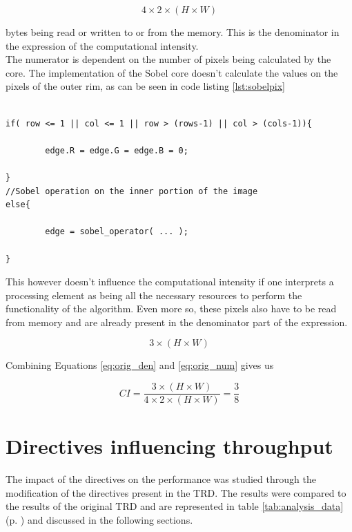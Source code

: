 \begin{equation} \label{eq:orig_den}
4 \times 2 \times ( H \times W )
\end{equation}

bytes being read or written to or from the memory. This is the denominator in the expression of the computational intensity.\\
The numerator is dependent on the number of pixels being calculated by the core. The implementation of the Sobel core doesn't calculate the values on the pixels of the outer rim, as can be seen in code listing \ref{lst:sobelpix}

\begin{lstlisting}[caption=Sobel Code Snippet, captionpos=b, label=lst:sobelpix]

if( row <= 1 || col <= 1 || row > (rows-1) || col > (cols-1)){
		
		edge.R = edge.G = edge.B = 0;
		
}
//Sobel operation on the inner portion of the image
else{

		edge = sobel_operator( ... );
		
}

\end{lstlisting}

This however doesn't influence the computational intensity if one interprets a processing element as being all the necessary resources to perform the functionality of the algorithm. Even more so, these pixels also have to be read from memory and are already present in the denominator part of the expression.


\begin{equation} \label{eq:orig_num}
3 \times ( H \times W )
\end{equation}

\medskip
Combining Equations \ref{eq:orig_den} and \ref{eq:orig_num} gives us
\medskip

\begin{equation}
CI = \frac{3 \times (H \times W)}{4 \times 2 \times ( H \times W )} = \frac{3}{8}
\end{equation}




\section{Directives influencing throughput}
\label{sec:throughput_directives}

The impact of the directives on the performance was studied through the modification of the directives present in the TRD. The results were compared to the results of the original TRD and are represented in table \ref{tab:analysis_data} (p. \pageref{tab:analysis_data}) and discussed in the following sections.

